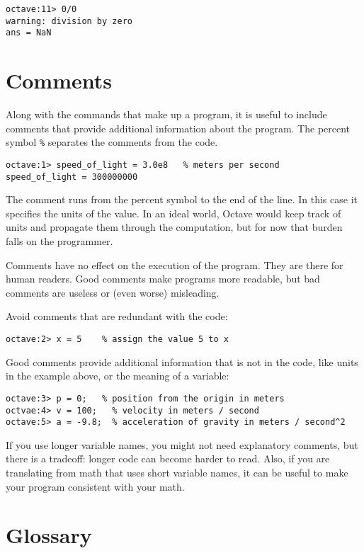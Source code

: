 \begin{verbatim}
octave:11> 0/0
warning: division by zero
ans = NaN
\end{verbatim}


\section{Comments}

Along with the commands that make up a program, it is useful
to include comments that provide additional information about the
program. The percent symbol {\tt \%} separates
the comments from the code.

\begin{verbatim}
octave:1> speed_of_light = 3.0e8   % meters per second
speed_of_light = 300000000
\end{verbatim}

The comment runs from the percent symbol to the end of the line.
In this case it specifies the units of the value. In an ideal world,
Octave would keep track of units and propagate them through the
computation, but for now that burden falls on the programmer.

Comments have no effect on the execution of the program. They
are there for human readers. Good comments make programs more
readable, but bad comments are useless or (even worse) misleading.

Avoid comments that are redundant with the code:

\begin{verbatim}
octave:2> x = 5    % assign the value 5 to x
\end{verbatim}

Good comments provide additional information that is not in the
code, like units in the example above, or the meaning of a variable:

\begin{verbatim}
octave:3> p = 0;   % position from the origin in meters 
octvae:4> v = 100;   % velocity in meters / second
octave:5> a = -9.8;  % acceleration of gravity in meters / second^2
\end{verbatim}

If you use longer variable names, you might not need explanatory
comments, but there is a tradeoff: longer code can become harder
to read. Also, if you are translating from math
that uses short variable names, it can be useful to make your
program consistent with your math. 

\section{Glossary}

